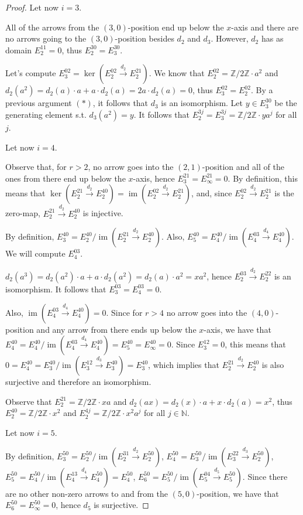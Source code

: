\documentclass{article}
\newcommand{\numberset}{\mathbb}
\newcommand{\N}{\numberset{N}}
\newcommand{\Z}{\numberset{Z}}
\DeclareMathOperator{\im}{im}
\begin{document}
\begin{proof}
    Let now $i=3$.

    All of the arrows from the $(3,0)$-position end up below the $x$-axis and
    there are no arrows going to the $(3,0)$-position besides $d_2$ and $d_3$.
    However, $d_2$ has as domain $E^{11}_2=0$, thus $E^{30}_2=E^{30}_3$.

    Let's compute $E^{02}_3=\ker(E^{02}_2\xrightarrow{d_2}E^{21}_2)$. We know
    that $E^{02}_2=\Z/2\Z\cdot a^2$ and $d_2(a^2)=d_2(a)\cdot a+a\cdot
    d_2(a)=2a\cdot d_2(a)=0$, thus $E^{02}_3=E^{02}_2$. By a previous argument
    $(*)$, it follows that $d_3$ is an isomorphism. Let $y\in E^{30}_3$ be the
    generating element s.t. $d_3(a^2)=y$. It follows that
    $E^{3j}_2=E^{3j}_3=\Z/2\Z\cdot ya^j$ for all $j$.

    Let now $i=4$.

    Observe that, for $r>2$, no arrow goes into the $(2,1)$-position and all of
    the ones from there end up below the $x$-axis, hence
    $E^{21}_3=E^{21}_\infty=0$. By definition, this means that
    $\ker(E^{21}_2\xrightarrow{d_2}E^{40}_2)=\im(E^{02}_2\xrightarrow{d_2}E^{21}_2)$,
    and, since $E^{02}_2\xrightarrow{d_2}E^{21}_2$ is the zero-map,
    $E^{21}_2\xrightarrow{d_2}E^{40}_2$ is injective.

    By definition, $E^{40}_3=E^{40}_2/\im(E^{21}_2\xrightarrow{d_2}E^{40}_2)$.
    Also, $E^{40}_5=E^{40}_4/\im(E^{03}_4\xrightarrow{d_4}E^{40}_4)$. We will
    compute $E^{03}_4$.

    $d_2(a^3)=d_2(a^2)\cdot a+a\cdot d_2(a^2)=d_2(a)\cdot a^2=xa^2$, hence
    $E^{03}_2\xrightarrow{d_2}E^{22}_2$ is an isomorphism. It follows that
    $E^{03}_3=E^{03}_4=0$.
    
    Also, $\im(E^{03}_4\xrightarrow{d_4}E^{40}_4)=0$. Since for $r>4$ no
    arrow goes into the $(4,0)$-position and any arrow from there ends up below
    the $x$-axis, we have that
    $E^{40}_4=E^{40}_4/\im(E^{03}_4\xrightarrow{d_4}E^{40}_4)=
    E^{40}_5=E^{40}_\infty=0$. Since $E^{12}_3=0$, this means that
    $0=E^{40}_4=E^{40}_3/\im(E^{12}_3\xrightarrow{d_3}E^{40}_3)=E^{40}_3$, which
    implies that $E^{21}_2\xrightarrow{d_2}E^{40}_2$ is also surjective and
    therefore an isomorphism.

    Observe that $E^{21}_2=\Z/2\Z\cdot xa$ and $d_2(ax)=d_2(x)\cdot a+x\cdot
    d_2(a)=x^2$, thus $E^{40}_2=\Z/2\Z\cdot x^2$ and
    $E^{4j}_2=\Z/2\Z\cdot x^2a^j$ for all $j\in\N$.

    Let now $i=5$.

    By definition, $E^{50}_3=E^{50}_2/\im(E^{31}_2\xrightarrow{d_2}E^{50}_2)$,
    $E^{50}_4=E^{50}_3/\im(E^{22}_3\xrightarrow{d_3}E^{50}_2)$,
    $E^{50}_5=E^{50}_4/\im(E^{13}_4\xrightarrow{d_4}E^{50}_4)=E^{50}_4$,
    $E^{50}_6=E^{50}_5/\im(E^{04}_5\xrightarrow{d_5}E^{50}_5)$. Since there are
    no other non-zero arrows to and from the $(5,0)$-position, we have that
    $E^{50}_6=E^{50}_\infty=0$, hence $d_5$ is surjective.


\end{proof}
\end{document}
